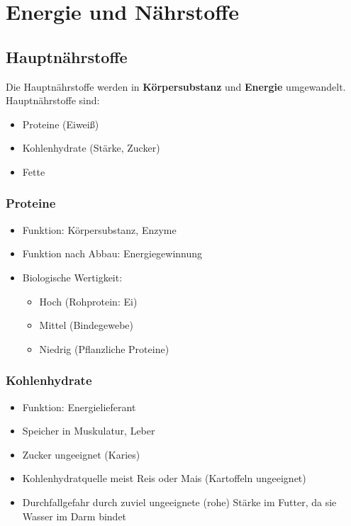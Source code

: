 \section{Energie und Nährstoffe}

    \subsection{Hauptnährstoffe}
        Die Hauptnährstoffe werden in \textbf{Körpersubstanz} und \textbf{Energie} umgewandelt. \\
        Hauptnährstoffe sind:
        \begin{itemize}
            \item Proteine (Eiweiß)
            \item Kohlenhydrate (Stärke, Zucker)
            \item Fette
        \end{itemize}

        \subsubsection{Proteine}
            \begin{itemize}
                \item Funktion: Körpersubstanz, Enzyme
                \item Funktion nach Abbau: Energiegewinnung
                \item Biologische Wertigkeit:
                \begin{itemize}
                    \item Hoch (Rohprotein: Ei)
                    \item Mittel (Bindegewebe)
                    \item Niedrig (Pflanzliche Proteine)
                \end{itemize}
            \end{itemize}

        \subsubsection{Kohlenhydrate}
            \begin{itemize}
                \item Funktion: Energielieferant
                \item Speicher in Muskulatur, Leber
                \item Zucker ungeeignet (Karies)
                \item Kohlenhydratquelle meist Reis oder Mais (Kartoffeln ungeeignet)
                \item Durchfallgefahr durch zuviel ungeeignete (rohe) Stärke im Futter, da sie Wasser im Darm bindet
            \end{itemize}

